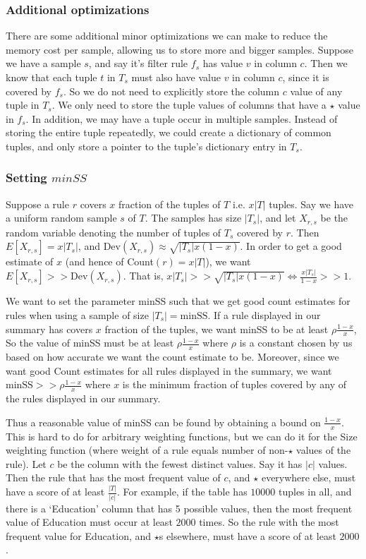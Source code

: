 \subsubsection{Additional optimizations}
There are some additional minor optimizations we can make to reduce the memory cost per sample, allowing us to store more and bigger samples. 
Suppose we have a sample $s$, and say it's filter rule $f_s$ has value $v$ in column $c$. Then we know that each tuple $t$ in $T_s$ must also have value $v$ in column $c$, since it is covered by $f_s$. So we do not need to explicitly store the column $c$ value of any tuple in $T_s$. We only need to store the tuple values of columns that have a $\star$ value in $f_s$.
In addition, we may have a tuple occur in multiple samples. Instead of storing the entire tuple repeatedly, we could create a dictionary of common tuples, and only store a pointer to the tuple's dictionary entry in $T_s$. 

\subsubsection{Setting $minSS$}
Suppose a rule $r$ covers $x$ fraction of the tuples of $T$ i.e. $x|T|$ tuples. Say we have a uniform random sample $s$ of $T$. The samples has size $|T_s|$, and let $X_{r,s}$ be the random variable denoting the number of tuples of $T_s$ covered by $r$. Then $E\left[ X_{r,s} \right] = x|T_s|$, and $\text{Dev}(X_{r,s}) \approx \sqrt{|T_s|x(1-x)}$. In order to get a good estimate of $x$ (and hence of Count$(r) = x|T|$), we want $E\left[X_{r,s}\right] >> \text{Dev}(X_{r,s})$. That is, $x|T_s| >> \sqrt{|T_s|x(1-x)} \Leftrightarrow \frac{x|T_s|}{1-x} >> 1$. 

We want to set the parameter minSS such that we get good count estimates for rules when using a sample of size $|T_s| = \text{minSS}$. If a rule displayed in our summary has covers $x$ fraction of the tuples, we want minSS to be at least $\rho\frac{1-x}{x}$, So the value of minSS must be at least $\rho\frac{1-x}{x}$ where $\rho$ is a constant chosen by us based on how accurate we want the count estimate to be. Moreover, since we want good Count estimates for all rules displayed in the summary, we want $\text{minSS} >> \rho\frac{1-x}{x}$ where $x$ is the minimum fraction of tuples covered by any of the rules displayed in our summary.

Thus a reasonable value of minSS can be found by obtaining a bound on $\frac{1-x}{x}$. This is hard to do for arbitrary weighting functions, but we can do it for the Size weighting function (where weight of a rule equals number of non-$\star$ values of the rule). Let $c$ be the column with the fewest distinct values. Say it has $|c|$ values. Then the rule that has the most frequent value of $c$, and $\star$ everywhere else, must have a score of at least $\frac{|T|}{|c|}$. For example, if the table has $10000$ tuples in all, and there is a `Education' column that has 5 possible values, then the most frequent value of Education must occur at least $2000$ times. So the rule with the most frequent value for Education, and $\star$s elsewhere, must have a score of at least $2000$. 

